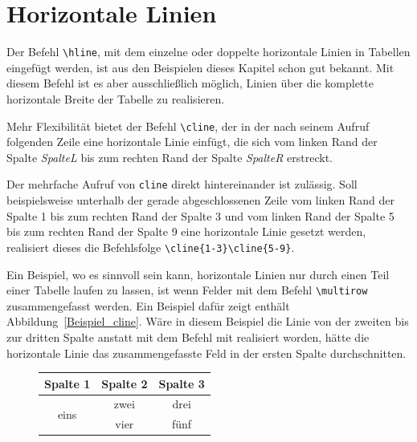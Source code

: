 \documentclass[a4paper,10pt,twoside]{scrbook}
\begin{document}
{\section{Horizontale Linien}

Der Befehl \verb!\hline!, mit dem einzelne oder doppelte horizontale Linien in Tabellen eingefügt werden, ist aus den Beispielen dieses Kapitel schon gut bekannt. Mit diesem Befehl ist es aber ausschließlich möglich, Linien über die komplette horizontale Breite der Tabelle zu realisieren. 

Mehr Flexibilität bietet der Befehl \verb!\cline!, der in der nach seinem Aufruf folgenden Zeile eine horizontale Linie einfügt, die sich vom
linken Rand der Spalte \textsl{SpalteL} bis zum rechten Rand der 
Spalte \textsl{SpalteR} erstreckt.


Der mehrfache Aufruf von \verb!cline! direkt hintereinander ist zulässig. 
Soll beispielsweise unterhalb der gerade abgeschlossenen Zeile vom linken 
Rand der Spalte 1 bis zum rechten Rand der Spalte 3 und vom linken 
Rand der Spalte 5 bis zum rechten Rand der Spalte 9 eine 
horizontale Linie gesetzt werden, realisiert dieses die Befehlsfolge 
\verb!\cline{1-3}\cline{5-9}!.



Ein Beispiel, wo es sinnvoll sein kann, horizontale Linien nur durch einen Teil einer Tabelle laufen zu lassen, ist wenn Felder mit dem Befehl 
\verb!\multirow! 
zusammengefasst werden. Ein Beispiel dafür zeigt enthält Abbildung~\ref{Beispiel_cline}. Wäre in diesem Beispiel die Linie von der zweiten bis zur dritten Spalte anstatt mit dem Befehl mit 
realisiert worden, hätte die horizontale Linie das zusammengefasste Feld in der ersten Spalte durchschnitten.




\begin{figure}[H]
\begin{minipage}[t]{0.44\textwidth}
\setlength{\parskip}{1em}

\centering
\label{Tabelle_Multirow2}
\begin{tabular}{|c|c|c|}
\hline
Spalte 1 & Spalte 2 & Spalte 3 \\
\hline\hline
\multirow{2}{*}{eins} & zwei & drei \\
\cline{2-3}
                      & vier & fünf \\
\hline
\end{tabular}
\end{minipage}
\hfill
\begin{minipage}[t]{0.54\textwidth}
\setlength{\parskip}{1em}


\end{minipage}
\end{figure}}
\end{document}
